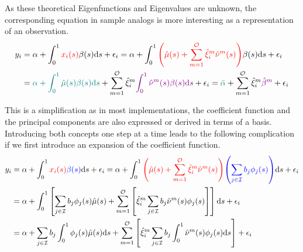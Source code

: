 \documentclass[11pt,twoside,a4paper]{article}
\begin{document}
	\newpage
	As these theoretical Eigenfunctions and Eigenvalues are unknown, the corresponding equation in sample analogs is more interesting as a representation of an observation.
	\begin{equation}
		\begin{split}
			y_i &= \alpha + \int_{0}^{1} {\color{red}x_i(s)} \beta(s) \mathrm{d}s + \epsilon_i
			= \alpha + \int_{0}^{1} {\color{red}\left(\hat{\mu}(s) + \sum_{m = 1}^{\mathcal{O}} \hat{\xi}^m_i \hat{\nu}^m(s)\right)} \beta(s) \mathrm{d}s + \epsilon_i\\
			&= {\color{teal}\alpha + \int_{0}^{1} \hat{\mu}(s) \beta(s) \mathrm{d}s} + \sum_{m = 1}^{\mathcal{O}} \hat{\xi}^m_i {\color{violet}\int_{0}^{1} \hat{\nu}^m(s) \beta(s) \mathrm{d}s} + \epsilon_i
			= {\color{teal}\bar{\alpha}} + \sum_{m = 1}^{\mathcal{O}} \hat{\xi}^m_i {\color{violet}\hat{\beta}^m} + \epsilon_i
		\end{split}
	\end{equation}

	This is a simplification as in most implementations, the coefficient function and the principal components are also expressed or derived in terms of a basis. Introducing both concepts one step at a time leads to the following complication if we first introduce an expansion of the coefficient function.
	\begin{equation}
		\begin{split}
			y_i &= \alpha + \int_{0}^{1} {\color{red}x_i(s)} {\color{blue}\beta(s)} \mathrm{d}s + \epsilon_i
			= \alpha + \int_{0}^{1} {\color{red}\left(\hat{\mu}(s) + \sum_{m = 1}^{\mathcal{O}} \hat{\xi}^{m}_i \hat{\nu}^{m}(s)\right)} {\color{blue}\left(\sum_{j \in \mathcal{I}} b_j \phi_j(s)\right)} \mathrm{d}s + \epsilon_i\\
			&= \alpha + \int_{0}^{1} \left[ \sum_{j \in \mathcal{I}} b_j \phi_j(s) \hat{\mu}(s) + \sum_{m = 1}^{\mathcal{O}} \left[ \hat{\xi}^m_i \sum_{j \in \mathcal{I}} b_j \hat{\nu}^m(s) \phi_j(s) \right] \right] \mathrm{d}s + \epsilon_i \\
			&= \alpha + \sum_{j \in \mathcal{I}} b_j \int_{0}^{1} \phi_j(s) \hat{\mu}(s) \mathrm{d}s + \sum_{m = 1}^{\mathcal{O}} \left[ \hat{\xi}^m_i \sum_{j \in \mathcal{I}} b_j \int_{0}^{1}\hat{\nu}^m(s) \phi_j(s) \mathrm{d}s \right] + \epsilon_i
		\end{split}
	\end{equation}
\end{document}
